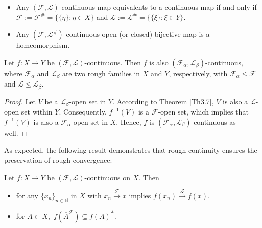 \documentclass[11pt]{amsart}
\begin{document}
\begin{corollary}
\begin{itemize}
    \item[(i)] Any $(\mathscr{F},\mathscr{L})$-continuous map equivalents to a continuous map if and only if $\mathscr{F}:=\mathscr{F^\#}=\{\{\eta\}: \eta\in X\}$ and $\mathscr{L}:=\mathscr{L}^\#=\{\{\xi\}:\xi\in Y\}.$

    \item[(ii)] Any $(\mathscr{F},\mathscr{L}^\#)$-continuous open (or closed) bijective map is a homeomorphism.
\end{itemize}
      
\end{corollary}



\begin{theorem}
 Let $f: X\rightarrow Y$ be $(\mathscr{F},\mathscr{L})$-continuous. Then $f$ is also $(\mathscr{F}_\alpha,\mathscr{L}_\beta)$-continuous, where $\mathscr{F}_\alpha$ and $\mathscr{L}_\beta$ are two rough families in $X$ and $Y$, respectively, with $\mathcal{F_\alpha}\leq \mathscr{F}$ and $\mathscr{L}\leq \mathscr{L}_\beta$.
\end{theorem}

\begin{proof}
   Let $V$ be a $\mathscr{L}_\beta$-open set in $Y$. According to Theorem \ref{Th3.7}, $V$ is also a $\mathscr{L}$-open set within $Y$. Consequently, $f^{-1}(V)$ is a $\mathscr{F}$-open set, which implies that $f^{-1}(V)$ is also a $\mathscr{F}_\alpha$-open set in $X$. Hence, $f$ is $(\mathcal{F_\alpha},\mathscr{L}_\beta)$-continuous as well.
\end{proof}




As expected, the following result demonstrates that rough continuity ensures the preservation of rough convergence:
\begin{theorem} Let $f: X\rightarrow Y$ be $(\mathscr{F},\mathscr{L})$-continuous on $X$. Then \begin{itemize}
    \item[(i)] for any $\{x_n\}_{n\in \mathbb{N}}$ in $X$ with $x_n\xrightarrow[]{\mathscr{F}} x$ implies $f(x_n)\xrightarrow[]{\mathscr{L}} f(x).$ 
    \item[(ii)] for $A\subset X,$ $f\left(\overline{A}^\mathscr{F}\right)\subseteq \overline{f(A)}^\mathscr{L}.$
\end{itemize}
\end{theorem}
\end{document}
